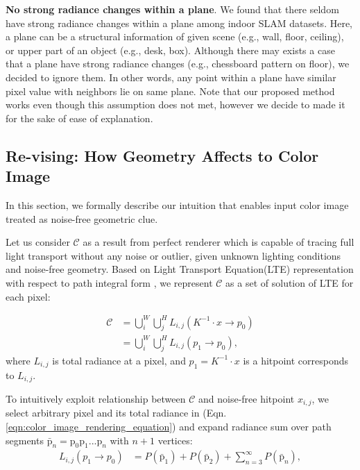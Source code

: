 \noindent \textbf{No strong radiance changes within a plane}. 
We found that there seldom have strong radiance changes within a plane among indoor SLAM datasets. 
Here, a plane can be a structural information of given scene (e.g., wall, floor, ceiling), or upper part of an object (e.g., desk, box).
Although there may exists a case that a plane have strong radiance changes (e.g., chessboard pattern on floor), we decided to ignore them. 
In other words, any point within a plane have similar pixel value with neighbors lie on same plane. 
Note that our proposed method works even though this assumption does not met, however we decide to made it for the sake of ease of explanation.


\subsection{Re-vising: How Geometry Affects to Color Image}
In this section, we formally describe our intuition that enables input color image treated as noise-free geometric clue.

Let us consider $\mathcal{C}$ as a result from perfect renderer which is capable of tracing full light transport without any noise or outlier, given unknown lighting conditions and noise-free geometry. 
Based on Light Transport Equation(LTE) representation with respect to path integral form \cite{veach1998robust}, we represent $\mathcal{C}$ as a set of solution of LTE for each pixel:

\begin{align}
    \mathcal{C} & = \bigcup_i^W \bigcup_j^H L_{i,j}\left(K^{-1}\cdot x\rightarrow p_0\right) \nonumber \\
    & = \bigcup_i^W \bigcup_j^H L_{i,j}\left(p_1\rightarrow p_0\right),
    \label{eqn:color_image_rendering_equation}
\end{align}
where $L_{i,j}$ is total radiance at a pixel, and $p_1=K^{-1}\cdot x$ is a hitpoint corresponds to $L_{i,j}$.

To intuitively exploit relationship between $\mathcal{C}$ and noise-free hitpoint $x_{i,j}$, we select arbitrary pixel and its total radiance in (Eqn. \ref{eqn:color_image_rendering_equation}) and expand radiance sum over path segments $\bar{\mathrm{p}}_n=\mathrm{p}_0\mathrm{p}_1...\mathrm{p}_n$ with $n+1$ vertices:
\begin{align}
    L_{i,j}\left(p_1\rightarrow p_0\right)& = \mathit{P}\left(\bar{\mathrm{p}}_1\right)+\mathit{P}\left(\bar{\mathrm{p}}_2\right)+\sum_{n=3}^\infty \mathit{P}\left(\bar{\mathrm{p}}_n\right), 
    \label{LTE_path_integral}
\end{align}

